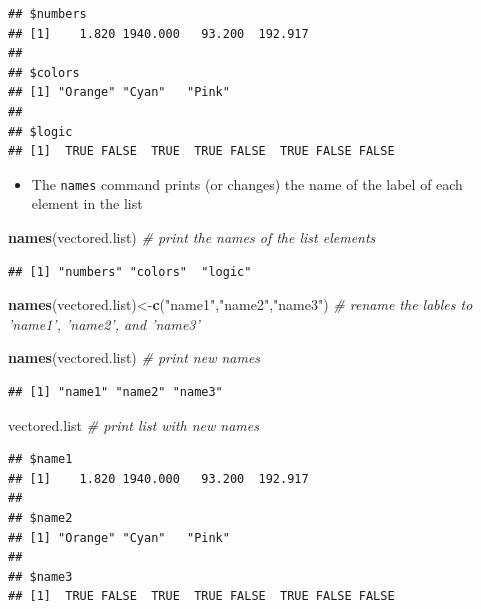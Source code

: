 \documentclass[]{book}
\newenvironment{Shaded}{\begin{snugshade}}{\end{snugshade}}
\newcommand{\KeywordTok}[1]{\textcolor[rgb]{0.13,0.29,0.53}{\textbf{#1}}}
\newcommand{\StringTok}[1]{\textcolor[rgb]{0.31,0.60,0.02}{#1}}
\newcommand{\CommentTok}[1]{\textcolor[rgb]{0.56,0.35,0.01}{\textit{#1}}}
\newcommand{\NormalTok}[1]{#1}
\providecommand{\tightlist}{%
  \setlength{\itemsep}{0pt}\setlength{\parskip}{0pt}}
\theoremstyle{definition}
\theoremstyle{definition}
\theoremstyle{definition}
\theoremstyle{remark}
\begin{document}
\begin{verbatim}
## $numbers
## [1]    1.820 1940.000   93.200  192.917
## 
## $colors
## [1] "Orange" "Cyan"   "Pink"  
## 
## $logic
## [1]  TRUE FALSE  TRUE  TRUE FALSE  TRUE FALSE FALSE
\end{verbatim}

\begin{itemize}
\tightlist
\item
  The \texttt{names} command prints (or changes) the name of the label
  of each element in the list
\end{itemize}

\begin{Shaded}
\begin{Highlighting}[]
\KeywordTok{names}\NormalTok{(vectored.list) }\CommentTok{# print the names of the list elements}
\end{Highlighting}
\end{Shaded}

\begin{verbatim}
## [1] "numbers" "colors"  "logic"
\end{verbatim}

\begin{Shaded}
\begin{Highlighting}[]
\KeywordTok{names}\NormalTok{(vectored.list)<-}\KeywordTok{c}\NormalTok{(}\StringTok{"name1"}\NormalTok{,}\StringTok{"name2"}\NormalTok{,}\StringTok{"name3"}\NormalTok{) }\CommentTok{# rename the lables to 'name1', 'name2', and 'name3'}

\KeywordTok{names}\NormalTok{(vectored.list) }\CommentTok{# print new names}
\end{Highlighting}
\end{Shaded}

\begin{verbatim}
## [1] "name1" "name2" "name3"
\end{verbatim}

\begin{Shaded}
\begin{Highlighting}[]
\NormalTok{vectored.list }\CommentTok{# print list with new names}
\end{Highlighting}
\end{Shaded}

\begin{verbatim}
## $name1
## [1]    1.820 1940.000   93.200  192.917
## 
## $name2
## [1] "Orange" "Cyan"   "Pink"  
## 
## $name3
## [1]  TRUE FALSE  TRUE  TRUE FALSE  TRUE FALSE FALSE
\end{verbatim}
\end{document}
